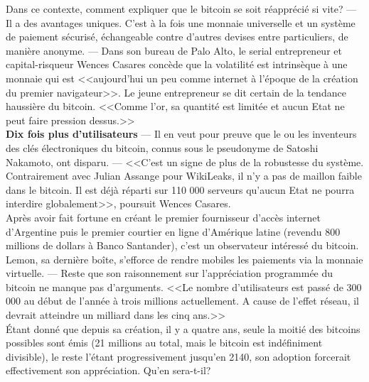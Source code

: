 \documentclass[11pt,twoside,a4paper]{article}
\begin{document}
Dans ce contexte, comment expliquer que le bitcoin se soit r{\'e}appr{\'e}ci{\'e} si vite? --- Il a des avantages uniques. C'est {\`a} la fois une monnaie universelle et un syst{\`e}me de paiement s{\'e}curis{\'e}, {\'e}changeable contre d'autres devises entre particuliers, de mani{\`e}re anonyme. --- Dans son bureau de Palo Alto, le serial entrepreneur et capital-risqueur Wences Casares conc{\`e}de que la volatilit{\'e} est intrins{\`e}que {\`a} une monnaie qui est <<aujourd'hui un peu comme internet {\`a} l'{\'e}poque de la cr{\'e}ation du premier navigateur>>. Le jeune entrepreneur se dit certain de la tendance haussi{\`e}re du bitcoin. <<Comme l'or, sa quantit{\'e} est limit{\'e}e et aucun Etat ne peut faire pression dessus.>> ~\\

\textbf{Dix fois plus d'utilisateurs} --- Il en veut pour preuve que le ou les inventeurs des cl{\'e}s {\'e}lectroniques du bitcoin, connus sous le pseudonyme de Satoshi Nakamoto, ont disparu. --- <<C'est un signe de plus de la robustesse du syst{\`e}me. Contrairement avec Julian Assange pour WikiLeaks, il n'y a pas de maillon faible dans le bitcoin. Il est d{\'e}j{\`a} r{\'e}parti sur 110 000 serveurs qu'aucun Etat ne pourra interdire globalement>>, poursuit Wences Casares. ~\\

Apr{\`e}s avoir fait fortune en cr{\'e}ant le premier fournisseur d'acc{\`e}s internet d'Argentine puis le premier courtier en ligne d'Am{\'e}rique latine (revendu 800 millions de dollars {\`a} Banco Santander), c'est un observateur int{\'e}ress{\'e} du bitcoin. Lemon, sa derni{\`e}re bo{\^i}te, s'efforce de rendre mobiles les paiements via la monnaie virtuelle. --- Reste que son raisonnement sur l'appr{\'e}ciation programm{\'e}e du bitcoin ne manque pas d'arguments. <<Le nombre d'utilisateurs est pass{\'e} de 300 000 au d{\'e}but de l'ann{\'e}e {\`a} trois millions actuellement. A cause de l'effet r{\'e}seau, il devrait atteindre un milliard dans les cinq ans.>> ~\\

{\'E}tant donn{\'e} que depuis sa cr{\'e}ation, il y a quatre ans, seule la moiti{\'e} des bitcoins possibles sont {\'e}mis (21 millions au total, mais le bitcoin est ind{\'e}finiment divisible), le reste l'{\'e}tant progressivement jusqu'en 2140, son adoption forcerait effectivement son appr{\'e}ciation. Qu'en sera-t-il? ~\\
\end{document}
